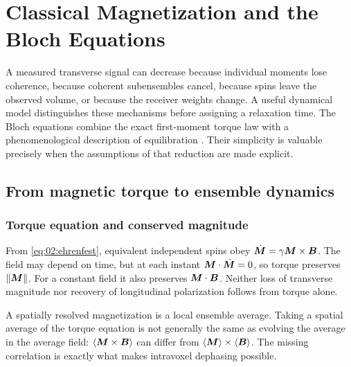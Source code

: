 \chapter{Classical Magnetization and the Bloch Equations}
\label{ch:03}

A measured transverse signal can decrease because individual moments lose
coherence, because coherent subensembles cancel, because spins leave the
observed volume, or because the receiver weights change. A useful dynamical
model distinguishes these mechanisms before assigning a relaxation time.
The Bloch equations combine the exact first-moment torque law with a
phenomenological description of equilibration \cite{bloch1946}.
Their simplicity is valuable precisely when the assumptions of that
reduction are made explicit.

\section{From magnetic torque to ensemble dynamics}
\label{sec:03:from-magnetic-torque-to-ensemble-dynamics}
\subsection{Torque equation and conserved magnitude}
From \cref{eq:02:ehrenfest}, equivalent independent spins obey
$\dot{\bm{M}}=\gamma\bm{M}\times\bm{B}$.
The field may depend on time, but at each instant
$\bm{M}\cdot\dot{\bm{M}}=0$, so torque preserves $\lVert\bm{M}\rVert$.
For a constant field it also preserves $\bm{M}\cdot\bm{B}$.
Neither loss of transverse magnitude nor recovery of longitudinal
polarization follows from torque alone.

A spatially resolved magnetization is a local ensemble average.
Taking a spatial average of the torque equation is not generally the same
as evolving the average in the average field:
$\langle\bm{M}\times\bm{B}\rangle$ can differ from
$\langle\bm{M}\rangle\times\langle\bm{B}\rangle$.
The missing correlation is exactly what makes intravoxel dephasing
possible.

